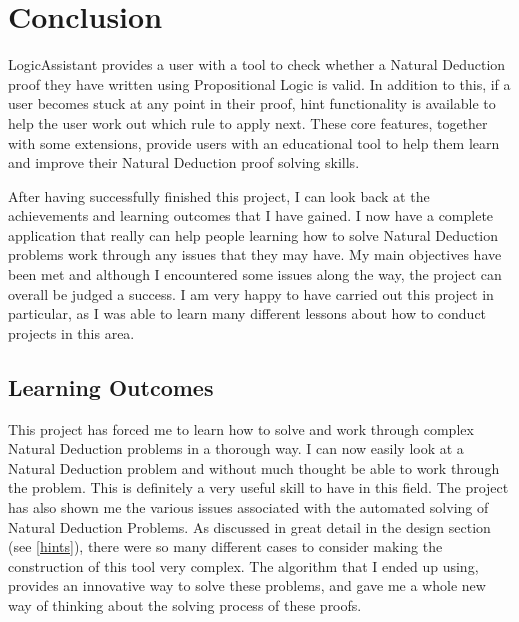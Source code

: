 \pagebreak
\section{Conclusion}

LogicAssistant provides a user with a tool to check whether a Natural Deduction proof they have written using Propositional Logic is valid. In addition to this, if a user becomes stuck at any point in their proof, hint functionality is available to help the user work out which rule to apply next. These core features, together with some extensions, provide users with an educational tool to help them learn and improve their Natural Deduction proof solving skills. 

After having successfully finished this project, I can look back at the achievements and learning outcomes that I have gained. I now have a complete application that really can help people learning how to solve Natural Deduction problems work through any issues that they may have. My main objectives have been met and although I encountered some issues along the way, the project can overall be judged a success. I am very happy to have carried out this project in particular, as I was able to learn many different lessons about how to conduct projects in this area.

\subsection{Learning Outcomes}
This project has forced me to learn how to solve and work through complex Natural Deduction problems in a thorough way. I can now easily look at a Natural Deduction problem and without much thought be able to work through the problem. This is definitely a very useful skill to have in this field. The project has also shown me the various issues associated with the automated solving of Natural Deduction Problems. As discussed in great detail in the design section (see \ref{hints}), there were so many different cases to consider making the construction of this tool very complex. The algorithm that I ended up using, provides an innovative way to solve these problems, and gave me a whole new way of thinking about the solving process of these proofs. 

